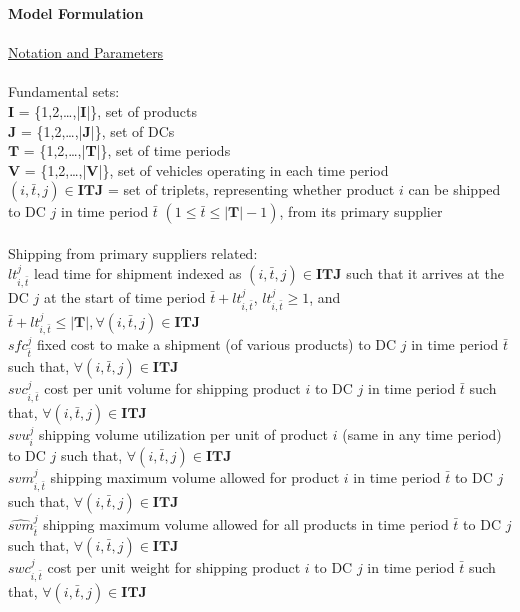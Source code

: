 \documentclass[11pt,letter]{article}
\begin{document}
\noindent
\textbf{Model Formulation}
\\
\\
\underline{Notation and Parameters} \\ \\
Fundamental sets: \\
$\textbf{I}$ \quad = \{1,2,\ldots ,|\textbf{I}|\}, set of products \\
$\textbf{J}$ \quad = \{1,2,\ldots ,|\textbf{J}|\}, set of DCs \\
$\textbf{T}$ \quad = \{1,2,\ldots ,|\textbf{T}|\}, set of time periods \\
$\textbf{V}$ \quad = \{1,2,\ldots ,|\textbf{V}|\}, set of vehicles operating in each time period \\
$(i,\bar{t},j)\in \textbf{ITJ}$ \quad = set of triplets, representing whether product $i$ can be shipped to DC $j$ in time period $\bar{t}$ $(1\leq \bar{t} \leq |\textbf{T}|-1)$, from its primary supplier \\
\\
Shipping from primary suppliers related: \\
$lt_{i,\bar{t}}^{j}$ \quad lead time for shipment indexed as $(i,\bar{t},j)\in \textbf{ITJ}$ such that it arrives at the DC $j$ at the start of time period $\bar{t}+lt_{i,\bar{t}}^{j}$, $lt_{i,\bar{t}}^{j}\geq 1$, and $\bar{t}+lt_{i,\bar{t}}^{j}\leq |\textbf{T}|, \forall (i,\bar{t},j)\in \textbf{ITJ}$\\
$sfc_{\bar{t}}^{j}$ \quad fixed cost to make a shipment (of various products) to DC $j$ in time period $\bar{t}$ such that, $\forall (i,\bar{t},j)\in \textbf{ITJ}$ \\
$svc_{i,\bar{t}}^{j}$ \quad cost per unit volume for shipping product $i$ to DC $j$ in time period $\bar{t}$ such that, $\forall (i,\bar{t},j)\in \textbf{ITJ}$\\
$svu_{i}^{j}$ \quad shipping volume utilization per unit of product $i$ (same in any time period) to DC $j$ such that, $\forall (i,\bar{t},j)\in \textbf{ITJ}$\\
$svm_{i,\bar{t}}^{j}$ \quad shipping maximum volume allowed for product $i$ in time period $\bar{t}$ to DC $j$ such that, $\forall (i,\bar{t},j)\in \textbf{ITJ}$\\
$\widehat{svm}_{\bar{t}}^{j}$ \quad shipping maximum volume allowed for all products in time period $\bar{t}$ to DC $j$ such that, $\forall (i,\bar{t},j)\in \textbf{ITJ}$\\
$swc_{i,\bar{t}}^{j}$ \quad cost per unit weight for shipping product $i$ to DC $j$  in time period $\bar{t}$ such that, $\forall (i,\bar{t},j)\in \textbf{ITJ}$\\
\end{document}
